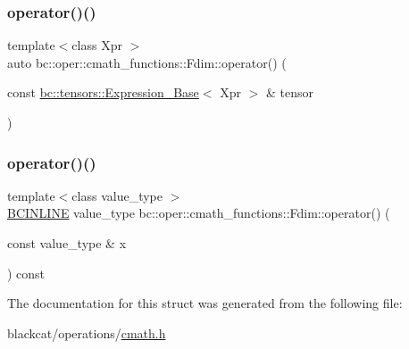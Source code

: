 \mbox{\label{structbc_1_1oper_1_1cmath__functions_1_1Fdim_a6bd57f1fc71ee8b68a0770c57cb06abf}} 
\subsubsection{\texorpdfstring{operator()()}{operator()()}\hspace{0.1cm}{\footnotesize\ttfamily [2/3]}}
{\footnotesize\ttfamily template$<$class Xpr $>$ \\
auto bc\+::oper\+::cmath\+\_\+functions\+::\+Fdim\+::operator() (\begin{DoxyParamCaption}\item[{const \hyperlink{classbc_1_1tensors_1_1Expression__Base}{bc\+::tensors\+::\+Expression\+\_\+\+Base}$<$ Xpr $>$ \&}]{tensor }\end{DoxyParamCaption})\hspace{0.3cm}{\ttfamily [inline]}}

\mbox{\label{structbc_1_1oper_1_1cmath__functions_1_1Fdim_a6a922f40e1936a467e3a2ae930694531}} 
\subsubsection{\texorpdfstring{operator()()}{operator()()}\hspace{0.1cm}{\footnotesize\ttfamily [3/3]}}
{\footnotesize\ttfamily template$<$class value\+\_\+type $>$ \\
\hyperlink{common_8h_a6699e8b0449da5c0fafb878e59c1d4b1}{B\+C\+I\+N\+L\+I\+NE} value\+\_\+type bc\+::oper\+::cmath\+\_\+functions\+::\+Fdim\+::operator() (\begin{DoxyParamCaption}\item[{const value\+\_\+type \&}]{x }\end{DoxyParamCaption}) const\hspace{0.3cm}{\ttfamily [inline]}}



The documentation for this struct was generated from the following file\+:\begin{DoxyCompactItemize}
\item 
blackcat/operations/\hyperlink{cmath_8h}{cmath.\+h}\end{DoxyCompactItemize}
